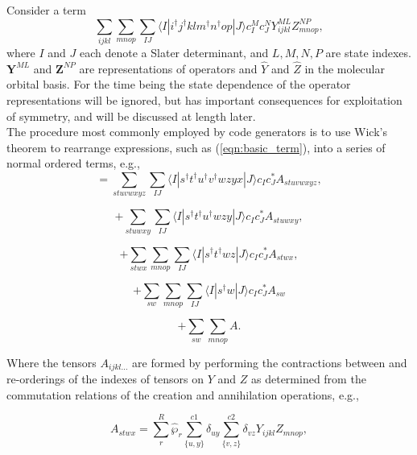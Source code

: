 Consider a term
\begin{equation}
\sum_{ijkl}\sum_{mnop} \sum_{IJ} \langle I | i^{\dagger}j^{\dagger}klm^{\dagger}n^{\dagger}op | J \rangle c^{M}_{I} c_{J}^{N} Y^{ML}_{ijkl}Z^{NP}_{mnop},
\label{eqn:basic_term}
\end{equation}
where $I$ and $J$ each denote a Slater determinant, and $L,M,N,P$ are state
indexes.  $\mathbf{Y}^{ML}$ and $\mathbf{Z}^{NP}$ are representations of
operators and $\hat{Y}$ and $\hat{Z}$ in the molecular orbital basis. For the time being
the state dependence of the operator representations will be ignored, but has important consequences
for exploitation of symmetry, and will be discussed at length later. \\ 

\noindent The procedure most commonly employed by code generators is to use Wick's theorem
to rearrange expressions, such as (\ref{eqn:basic_term}), into a series of normal ordered terms, e.g.,
\begin{equation*}
=\sum_{stuvwxyz} \sum_{IJ} \langle I | s^{\dagger}t^{\dagger}u^{\dagger}v^{\dagger}wzyx | J \rangle c_{I} c^{*}_{J} A_{stuvwxyz},
\end{equation*}

\begin{equation*}
+\sum_{stuwxy} \sum_{IJ} \langle I | s^{\dagger}t^{\dagger}u^{\dagger}wzy | J \rangle c_{I} c^{*}_{J} A_{stuwxy},
\end{equation*}

\begin{equation*}
+\sum_{stwx}\sum_{mnop} \sum_{IJ} \langle I | s^{\dagger}t^{\dagger}wz | J \rangle c_{I} c^{*}_{J} A_{stwx},
\end{equation*}

\begin{equation*}
+\sum_{sw}\sum_{mnop} \sum_{IJ} \langle I | s^{\dagger}w | J \rangle c_{I} c^{*}_{J} A_{sw}
\end{equation*}

\begin{equation*}
+\sum_{sw}\sum_{mnop}  A .
\end{equation*}

\noindent Where the tensors $A_{ijkl...}$ are formed by performing the 
contractions between and re-orderings of the indexes of tensors on $Y$ and $Z$ as 
determined from the commutation relations of the creation and annihilation operations, e.g.,
 
\begin{equation*}
A_{stwx} = \sum_{r}^{R}\hat{\wp}_{r}\sum^{c1}_{\{u,y\}}\delta_{uy}\sum^{c2}_{\{v,z\}} \delta_{vz}Y_{ijkl}Z_{mnop},
\end{equation*}

